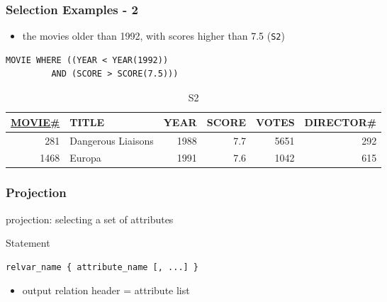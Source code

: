\documentclass[dvipsnames]{beamer}
\theoremstyle{plain}
\begin{document}
\begin{frame}[fragile]
  \frametitle{Selection Examples - 2}

  \begin{example}
    \begin{itemize}
      \item the movies older than 1992, with scores higher than 7.5
        (\texttt{S2})
    \end{itemize}

    \begin{lstlisting}
MOVIE WHERE ((YEAR < YEAR(1992))
         AND (SCORE > SCORE(7.5)))
    \end{lstlisting}

    \pause
    \vspace{-10pt}
    \begin{tiny}
    \begin{table}
      \caption{S2}
      \begin{tabular}{|r|l|r|r|r|r|}\hline
\underline{MOVIE\#} & TITLE & YEAR & SCORE & VOTES & DIRECTOR\#\\[2pt]\hline\hline
   281 & Dangerous Liaisons & 1988 &   7.7 &  5651 &        292\\\hline
  1468 & Europa             & 1991 &   7.6 &  1042 &        615\\\hline
      \end{tabular}
    \end{table}
    \end{tiny}
  \end{example}
\end{frame}

\begin{frame}[fragile]
  \frametitle{Projection}

  \begin{definition}
    \alert{projection}: selecting a set of attributes
  \end{definition}

  \pause
  \begin{block}{Statement}
    \begin{lstlisting}
relvar_name { attribute_name [, ...] }
    \end{lstlisting}
  \end{block}

  \pause
  \begin{itemize}
    \item output relation header = attribute list
  \end{itemize}
\end{frame}
\end{document}
